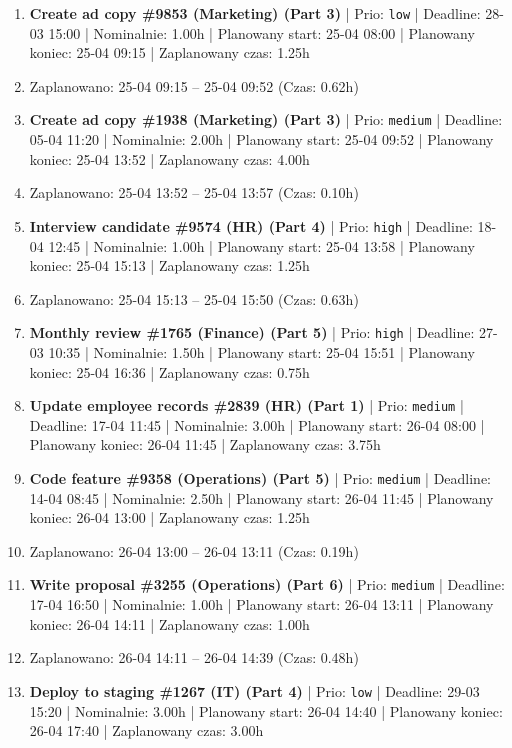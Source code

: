 {\begin{enumerate}
  \item [\textbf{14679}] \textbf{Create ad copy \#9853 (Marketing) (Part 3)} | Prio: \texttt{low} | Deadline: 28-03 15:00 | Nominalnie: 1.00h | Planowany start: 25-04 08:00 | Planowany koniec: 25-04 09:15 | Zaplanowany czas: 1.25h
  \item [\textbf{PRZERWA}] Zaplanowano: 25-04 09:15 -- 25-04 09:52 (Czas: 0.62h)
  \item [\textbf{14652}] \textbf{Create ad copy \#1938 (Marketing) (Part 3)} | Prio: \texttt{medium} | Deadline: 05-04 11:20 | Nominalnie: 2.00h | Planowany start: 25-04 09:52 | Planowany koniec: 25-04 13:52 | Zaplanowany czas: 4.00h
  \item [\textbf{PRZERWA}] Zaplanowano: 25-04 13:52 -- 25-04 13:57 (Czas: 0.10h)
  \item [\textbf{14612}] \textbf{Interview candidate \#9574 (HR) (Part 4)} | Prio: \texttt{high} | Deadline: 18-04 12:45 | Nominalnie: 1.00h | Planowany start: 25-04 13:58 | Planowany koniec: 25-04 15:13 | Zaplanowany czas: 1.25h
  \item [\textbf{PRZERWA}] Zaplanowano: 25-04 15:13 -- 25-04 15:50 (Czas: 0.63h)
  \item [\textbf{14627}] \textbf{Monthly review \#1765 (Finance) (Part 5)} | Prio: \texttt{high} | Deadline: 27-03 10:35 | Nominalnie: 1.50h | Planowany start: 25-04 15:51 | Planowany koniec: 25-04 16:36 | Zaplanowany czas: 0.75h
  \item [\textbf{14670}] \textbf{Update employee records \#2839 (HR) (Part 1)} | Prio: \texttt{medium} | Deadline: 17-04 11:45 | Nominalnie: 3.00h | Planowany start: 26-04 08:00 | Planowany koniec: 26-04 11:45 | Zaplanowany czas: 3.75h
  \item [\textbf{14661}] \textbf{Code feature \#9358 (Operations) (Part 5)} | Prio: \texttt{medium} | Deadline: 14-04 08:45 | Nominalnie: 2.50h | Planowany start: 26-04 11:45 | Planowany koniec: 26-04 13:00 | Zaplanowany czas: 1.25h
  \item [\textbf{PRZERWA}] Zaplanowano: 26-04 13:00 -- 26-04 13:11 (Czas: 0.19h)
  \item [\textbf{14654}] \textbf{Write proposal \#3255 (Operations) (Part 6)} | Prio: \texttt{medium} | Deadline: 17-04 16:50 | Nominalnie: 1.00h | Planowany start: 26-04 13:11 | Planowany koniec: 26-04 14:11 | Zaplanowany czas: 1.00h
  \item [\textbf{PRZERWA}] Zaplanowano: 26-04 14:11 -- 26-04 14:39 (Czas: 0.48h)
  \item [\textbf{14686}] \textbf{Deploy to staging \#1267 (IT) (Part 4)} | Prio: \texttt{low} | Deadline: 29-03 15:20 | Nominalnie: 3.00h | Planowany start: 26-04 14:40 | Planowany koniec: 26-04 17:40 | Zaplanowany czas: 3.00h

\end{enumerate}}
